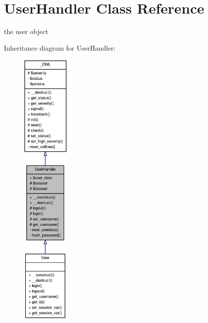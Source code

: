 \section{UserHandler Class Reference}
\label{classUserHandler}


the user object  




Inheritance diagram for UserHandler:\nopagebreak
\begin{figure}[H]
\begin{center}
\leavevmode
\includegraphics[height=400pt]{classUserHandler__inherit__graph}
\end{center}
\end{figure}


